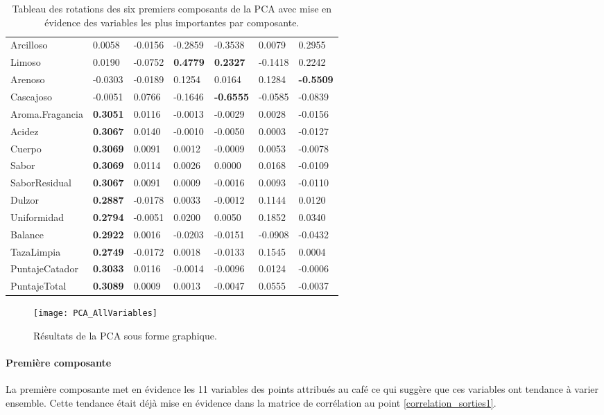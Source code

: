 \begin{table}[H]
\begin{tabular}{lllllll}
		Arcilloso       & 0.0058  & -0.0156 & -0.2859 & -0.3538 & 0.0079  & 0.2955  \\
		Limoso          & 0.0190  & -0.0752 & \textbf{0.4779}  & \textbf{0.2327}  & -0.1418 & 0.2242  \\
		Arenoso         & -0.0303 & -0.0189 & 0.1254  & 0.0164  & 0.1284  & \textbf{-0.5509} \\
		Cascajoso       & -0.0051 & 0.0766  & -0.1646 & \textbf{-0.6555} & -0.0585 & -0.0839 \\
		Aroma.Fragancia & \textbf{0.3051}  & 0.0116  & -0.0013 & -0.0029 & 0.0028  & -0.0156 \\
		Acidez          & \textbf{0.3067}  & 0.0140  & -0.0010 & -0.0050 & 0.0003  & -0.0127 \\
		Cuerpo          & \textbf{0.3069}  & 0.0091  & 0.0012  & -0.0009 & 0.0053  & -0.0078 \\
		Sabor           & \textbf{0.3069}  & 0.0114  & 0.0026  & 0.0000  & 0.0168  & -0.0109 \\
		SaborResidual   & \textbf{0.3067}  & 0.0091  & 0.0009  & -0.0016 & 0.0093  & -0.0110 \\
		Dulzor          & \textbf{0.2887}  & -0.0178 & 0.0033  & -0.0012 & 0.1144  & 0.0120  \\
		Uniformidad     & \textbf{0.2794}  & -0.0051 & 0.0200  & 0.0050  & 0.1852  & 0.0340  \\
		Balance         & \textbf{0.2922}  & 0.0016  & -0.0203 & -0.0151 & -0.0908 & -0.0432 \\
		TazaLimpia      & \textbf{0.2749}  & -0.0172 & 0.0018  & -0.0133 & 0.1545  & 0.0004  \\
		PuntajeCatador  & \textbf{0.3033}  & 0.0116  & -0.0014 & -0.0096 & 0.0124  & -0.0006 \\
		PuntajeTotal    & \textbf{0.3089}  & 0.0009  & 0.0013  & -0.0047 & 0.0555  & -0.0037 \\
	\end{tabular}
\caption{\label{TablePCAResult1}Tableau des rotations des six premiers composants de la PCA avec mise en évidence des variables les plus importantes par composante.}
\end{table}


\begin{figure}[H]
	\texttt{[image: PCA\_AllVariables]}
	\caption{\label{FigurePCAResult1} Résultats de la PCA sous forme graphique. }
\end{figure}


\paragraph{Première composante} La première composante met en évidence les 11 variables des points attribués au café ce qui suggère que ces variables ont tendance à varier ensemble. Cette tendance était déjà mise en évidence dans la matrice de corrélation au point \ref{correlation_sorties1}. 

